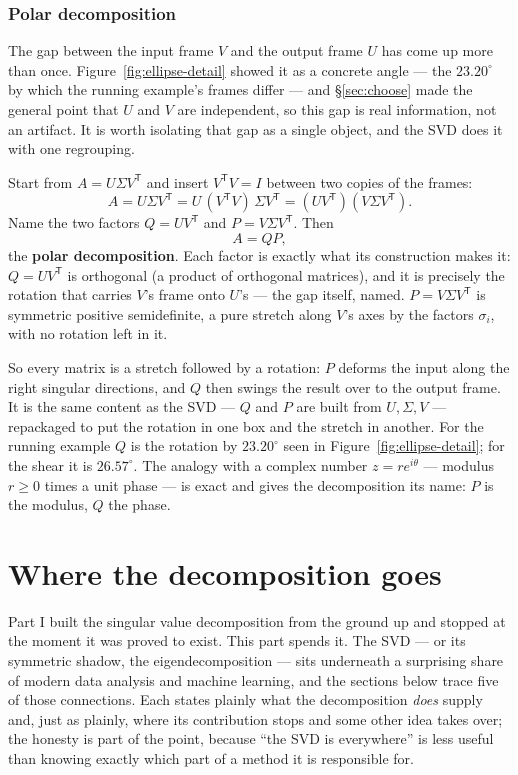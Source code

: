 \documentclass[11pt]{article}
\numberwithin{equation}{section}
\newcommand{\T}{^{\mathsf{T}}}
\theoremstyle{plainish}
\begin{document}
\section{Polar decomposition}
\label{sec:polar}

The gap between the input frame $V$ and the output frame $U$ has come up more
than once. Figure~\ref{fig:ellipse-detail} showed it as a concrete angle --- the
$23.20^\circ$ by which the running example's frames differ --- and
\S\ref{sec:choose} made the general point that $U$ and $V$ are independent, so
this gap is real information, not an artifact. It is worth isolating that gap as
a single object, and the SVD does it with one regrouping.

Start from $A = U\Sigma V\T$ and insert $V\T V = I$ between two copies of the
frames:
\begin{equation}
A = U\Sigma V\T = U\,(V\T V)\,\Sigma V\T = (U V\T)(V\Sigma V\T) .
\end{equation}
Name the two factors $Q = UV\T$ and $P = V\Sigma V\T$. Then
\begin{equation}
A = QP,
\end{equation}
the \textbf{polar decomposition}. Each factor is exactly what its construction
makes it: $Q = UV\T$ is orthogonal (a product of orthogonal matrices), and it is
precisely the rotation that carries $V$'s frame onto $U$'s --- the gap itself,
named. $P = V\Sigma V\T$ is symmetric positive semidefinite, a pure stretch
along $V$'s axes by the factors $\sigma_i$, with no rotation left in it.

So every matrix is a stretch followed by a rotation: $P$ deforms the input along
the right singular directions, and $Q$ then swings the result over to the output
frame. It is the same content as the SVD --- $Q$ and $P$ are built from
$U, \Sigma, V$ --- repackaged to put the rotation in one box and the stretch in
another. For the running example $Q$ is the rotation by $23.20^\circ$ seen in
Figure~\ref{fig:ellipse-detail}; for the shear it is $26.57^\circ$. The analogy
with a complex number $z = re^{i\theta}$ --- modulus $r \geq 0$ times a unit
phase --- is exact and gives the decomposition its name: $P$ is the modulus,
$Q$ the phase.

\part{Where the decomposition goes}

\noindent
Part I built the singular value decomposition from the ground up and stopped at
the moment it was proved to exist. This part spends it. The SVD --- or its
symmetric shadow, the eigendecomposition --- sits underneath a surprising share
of modern data analysis and machine learning, and the sections below trace five
of those connections. Each states plainly what the decomposition \emph{does}
supply and, just as plainly, where its contribution stops and some other idea
takes over; the honesty is part of the point, because ``the SVD is everywhere''
is less useful than knowing exactly which part of a method it is responsible for.
\end{document}
